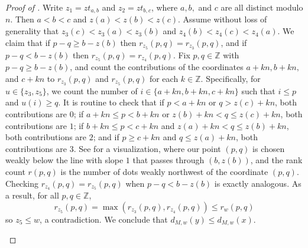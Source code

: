 \documentclass[11pt]{amsart}
\theoremstyle{definition}
\theoremstyle{remark}
\numberwithin{equation}{section}
\newcommand{\Z}{\mathbb Z}
\begin{document}
\begin{proof}[Proof of ]
Write $z_1=zt_{a,b}$ and $z_2=zt_{b,c}$, where $a,b,$ and $c$ are all distinct modulo $n$. Then $a<b<c$ and $z(a)<z(b)<z(c)$. Assume without loss of generality that $z_3(c)<z_3(a)<z_3(b)$ and $z_4(b)<z_4(c)<z_4(a)$. We claim that if $p-q\geq b-z(b)$ then $r_{z_5}(p,q)=r_{z_3}(p,q)$, and if $p-q<b-z(b)$ then $r_{z_5}(p,q)=r_{z_4}(p,q)$. Fix $p,q\in\Z$ with $p-q\geq b-z(b)$, and count the contributions of the coordinates $a+kn,b+kn,$ and $c+kn$ to $r_{z_3}(p,q)$ and $r_{z_5}(p,q)$ for each $k\in\Z$. Specifically, for $u\in\{z_3,z_5\}$, we count the number of $i\in\{a+kn,b+kn,c+kn\}$ such that $i\leq p$ and $u(i)\geq q$. It is routine to check that if $p<a+kn$ or $q>z(c)+kn$, both contributions are $0$; if $a+kn\leq p<b+kn$ or $z(b)+kn<q\leq z(c)+kn$, both contributions are $1$; if $ b+kn\leq p<c+kn$ and $z(a)+kn<q\leq z(b)+kn$, both contributions are $2$; and if $p\geq c+kn$ and $q\leq z(a)+kn$, both contributions are $3$. See  for a visualization, where our point $(p,q)$ is chosen weakly below the line with slope $1$ that passes through $(b,z(b))$, and the rank count $r(p,q)$ is the number of dots weakly northwest of the coordinate $(p,q)$. Checking $r_{z_4}(p,q)=r_{z_5}(p,q)$ when $p-q<b-z(b)$ is exactly analogous. As a result, for all $p,q\in\Z$, \[r_{z_5}(p,q)=\max(r_{z_3}(p,q),r_{z_4}(p,q))\leq r_w(p,q)\]
so $z_5\leq w$, a contradiction. We conclude that $d_{M,w}(y)\leq d_{M,w}(x)$. 
\begin{figure}[h!]
\centering
{}
\qquad\qquad
\begin{tikzpicture}[scale=0.35]

\end{tikzpicture}
\end{figure}
\end{proof}
\end{document}
